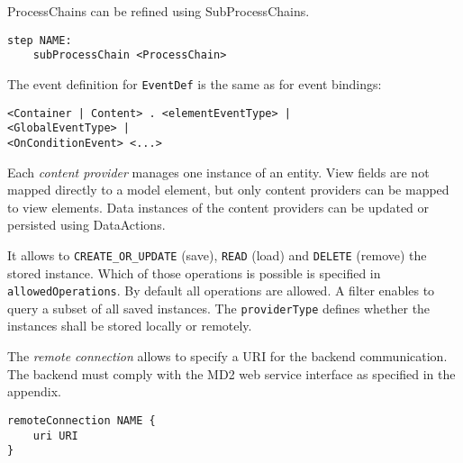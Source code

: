 ProcessChains can be refined using SubProcessChains.
\begin{lstlisting}
step NAME:
	subProcessChain <ProcessChain>
\end{lstlisting}

The event definition for \lstinline!EventDef! is the same as for event bindings:
\begin{lstlisting}
<Container | Content> . <elementEventType> |
<GlobalEventType> |
<OnConditionEvent> <...>
\end{lstlisting}

Each \textit{content provider} manages one instance of an entity. View fields are not mapped directly to a model element, but only content providers can be mapped to view elements. Data instances of the content providers can be updated or persisted using DataActions.

It allows to \lstinline!CREATE_OR_UPDATE! (save), \lstinline!READ! (load) and \lstinline!DELETE! (remove) the stored instance. Which of those operations is possible is specified in \lstinline!allowedOperations!. By default all operations are allowed. A filter enables to query a subset of all saved instances. The \lstinline!providerType! defines whether the instances shall be stored locally or remotely.

The \textit{remote connection} allows to specify a URI for the backend communication. The backend must comply with the MD2 web service interface as specified in the appendix.
\begin{lstlisting}
remoteConnection NAME {
	uri URI
}
\end{lstlisting}

